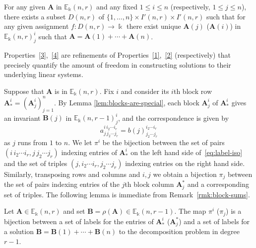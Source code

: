 \documentclass[ALCO,ThmDefs,Unicode,epreuves]{cedram}
\newcommand{\E}{\mathbb{E}}
\newcommand{\bA}{\mathbf{A}}
\newcommand{\bB}{\mathbf{B}}
\begin{document}
\begin{property}\label{4}
 For any given $\bA$ in $\E_\Bbbk(n,r)$ and any fixed $1\le i \le n$
 \textup{(}respectively, $1 \le j \le n$\textup{)}, there exists a
 subset $D(n,r)$ of $\{1, \dots, n\} \times I'(n,r) \times I'(n,r)$
 such that for any given assignment $f: D(n,r) \to \Bbbk$ there exist
 unique $\bA(j)$ \textup{(}\resp $\bA(i)$\textup{)} in
 $\E_\Bbbk(n,r)^i_j$ such that $\bA = \bA(1) + \cdots + \bA(n)$.
\end{property}

Properties~\ref{3},~\ref{4} are refinements of
Properties~\ref{1},~\ref{2} (respectively) that precisely quantify the
amount of freedom in constructing solutions to their underlying linear
systems.

Suppose that $\bA$ is in $\E_\Bbbk(n,r)$. Fix $i$ and consider its
$i$th block row $\bA^i_* = (\bA^i_j)_{j=1}^n$. By Lemma
\ref{lem:blocks-are-special}, each block $\bA^i_j$ of $\bA^i_*$ gives
an invariant $\bB(j)$ in $\E_\Bbbk(n,r-1)^i_j$, and the correspondence
is given by
\begin{equation}\label{eq:label-iso}
 a^{i\, i_2 \cdots i_r}_{j\,j_2 \cdots j_r} = b(j)^{i_2 \cdots i_r}_{j_2 \cdots j_r}
\end{equation}
as $j$ runs from $1$ to $n$. We let $\pi^i$ be the bijection between
the set of pairs $(i\, i_2 \cdots i_r, j\,j_2 \cdots j_r)$ indexing
entries of $\bA^i_*$ on the left hand side of~\eqref{eq:label-iso} and
the set of triples $(j, i_2 \cdots i_r, j_2 \cdots j_r)$ indexing
entries on the right hand side. Similarly, transposing rows and
columns and $i,j$ we obtain a bijection $\pi_j$ between the set of
pairs indexing entries of the $j$th block column $\bA^*_j$ and a
corresponding set of triples. The following lemma is immediate from
Remark~\ref{rmk:block-sums}.


\begin{lemm}\label{lem:bijections}
Let $\bA \in \E_\Bbbk(n,r)$ and set $\bB = \rho(\bA) \in
\E_\Bbbk(n,r-1)$. The map $\pi^i$ \textup{(}\resp $\pi_j$\textup{)}
is a bijection between a set of labels for the entries of $\bA^i_*$
\textup{(}\resp $\bA^*_j$\textup{)} and a set of labels for a solution
$\bB = \bB(1)+ \cdots + \bB(n)$ to the decomposition problem in degree
$r-1$.
\end{lemm}
\end{document}
